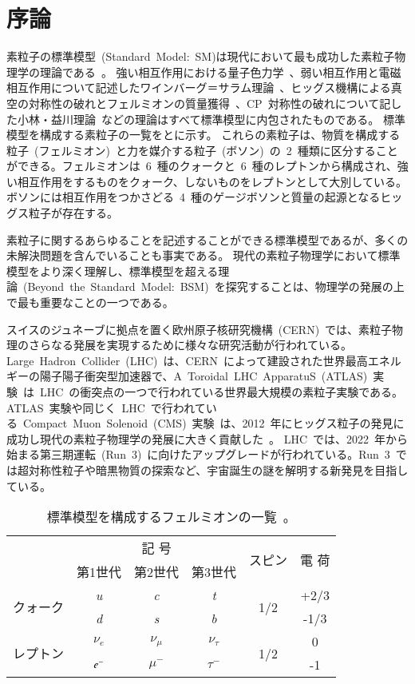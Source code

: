 \chapter{序論}
\thispagestyle{empty}
\label{chap:1}
素粒子の標準模型~(Standard~Model:~SM)は現代において最も成功した素粒子物理学の理論である~\cite{URL:10}。
強い相互作用における量子色力学~\cite{AR:04}、弱い相互作用と電磁相互作用について記述したワインバーグ＝サラム理論~\cite{AR:05,AR:05a}、ヒッグス機構による真空の対称性の破れとフェルミオンの質量獲得~\cite{AR:06}、CP~対称性の破れについて記した小林・益川理論~\cite{AR:07}などの理論はすべて標準模型に内包されたものである。
標準模型を構成する素粒子の一覧をとに示す。
これらの素粒子は、物質を構成する粒子~(フェルミオン)~と力を媒介する粒子~(ボソン)~の~2~種類に区分することができる。フェルミオンは~6~種のクォークと~6~種のレプトンから構成され、強い相互作用をするものをクォーク、しないものをレプトンとして大別している。ボソンには相互作用をつかさどる~4~種のゲージボソンと質量の起源となるヒッグス粒子が存在する。

素粒子に関するあらゆることを記述することができる標準模型であるが、多くの未解決問題を含んでいることも事実である。
現代の素粒子物理学において標準模型をより深く理解し、標準模型を超える理論~(Beyond~the~Standard~Model:~BSM)~を探究することは、物理学の発展の上で最も重要なことの一つである。

スイスのジュネーブに拠点を置く欧州原子核研究機構~(CERN)~\cite{URL:11}では、素粒子物理のさらなる発展を実現するために様々な研究活動が行われている。Large~Hadron~Collider~(LHC)~\cite{URL:12}は、CERN~によって建設された世界最高エネルギーの陽子陽子衝突型加速器で、A~Toroidal~LHC~ApparatuS~(ATLAS)~実験~\cite{URL:13}は~LHC~の衝突点の一つで行われている世界最大規模の素粒子実験である。
ATLAS~実験や同じく~LHC~で行われている~Compact~Muon~Solenoid~(CMS)~実験~\cite{URL:14}は、2012~年にヒッグス粒子の発見に成功し現代の素粒子物理学の発展に大きく貢献した~\cite{TR:03,TR:03a}。
LHC~では、2022~年から始まる第三期運転~(Run~3)~に向けたアップグレードが行われている。Run~3~では超対称性粒子や暗黒物質の探索など、宇宙誕生の謎を解明する新発見を目指している。

\begin{table}[htbp]
	\centering
	\begin{tabular}{c|ccc|c|c} \hline
	& \multicolumn{3}{c|}{記 号} & \multirow{2}{*}{スピン} & \multirow{2}{*}{電  荷} \\
	& 第1世代 & 第2世代 & 第3世代 &&  \\ \hline\hline
	\multirow{2}{*}{クォーク} & \it{u} & \it{c} & \it{t} & \multirow{2}{*}{1/2} & +2/3 \\
	& \it{d} & \it{s} & \it{b} &  & -1/3 \\ \hline
	\multirow{2}{*}{レプトン} & $\nu_{e}$ & $\nu_{\mu}$ & $\nu_{\tau}$ & \multirow{2}{*}{1/2} & 0 \\
	& $\it{e}^-$ & $\mu^-$ & $\tau^-$ &  & -1 \\ \hline
	\end{tabular}
	\caption[標準模型を構成するフェルミオンの一覧]{標準模型を構成するフェルミオンの一覧~\cite{URL:10}。}
	\label{tb:SM1}
\end{table}

